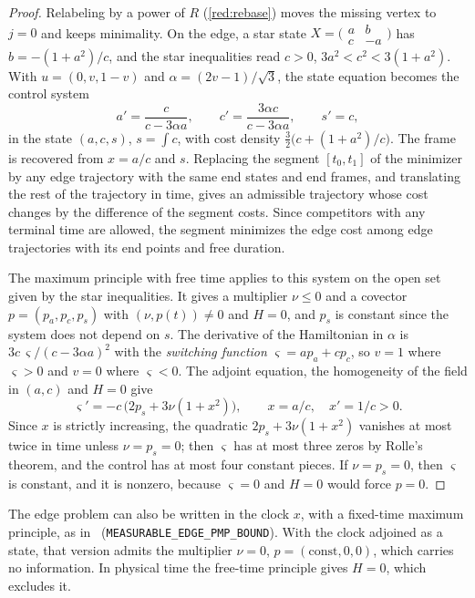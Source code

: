 \begin{proof}
Relabeling by a power of $R$ (\cref{red:rebase}) moves the missing vertex to $j=0$ and keeps
minimality. On the edge, a star state $X=\bigl(\begin{smallmatrix}a&b\\c&-a\end{smallmatrix}\bigr)$
has $b=-(1+a^2)/c$, and the star inequalities read $c>0$, $3a^2<c^2<3(1+a^2)$. With
$u=(0,v,1-v)$ and $\alpha=(2v-1)/\sqrt3$, the state equation becomes the control system
\[
a'=\frac{c}{c-3\alpha a},\qquad c'=\frac{3\alpha c}{c-3\alpha a},\qquad s'=c,
\]
in the state $(a,c,s)$, $s=\int c$, with cost density $\frac32\bigl(c+(1+a^2)/c\bigr)$. The frame is recovered from $x=a/c$ and $s$. Replacing the segment $[t_0,t_1]$ of the minimizer by any
edge trajectory with the same end states and end frames, and translating the rest of the
trajectory in time, gives an admissible trajectory whose cost changes by the difference of the
segment costs. Since competitors with any terminal time are
allowed, the segment minimizes the edge cost among edge trajectories with its end points and free
duration.

The maximum principle with free time applies to this system on the open set given by the star
inequalities. It gives a multiplier $\nu\le0$ and a covector $p=(p_a,p_c,p_s)$ with
$(\nu,p(t))\ne0$ and $H=0$, and $p_s$ is constant since the system does not depend on $s$. The
derivative of the Hamiltonian in $\alpha$ is $3c\,\varsigma/(c-3\alpha a)^2$ with the
\emph{switching function} $\varsigma=ap_a+cp_c$, so $v=1$ where $\varsigma>0$ and $v=0$ where
$\varsigma<0$. The adjoint equation, the homogeneity of the field in $(a,c)$ and $H=0$ give
\[
\varsigma'=-c\,\bigl(2p_s+3\nu(1+x^2)\bigr),\qquad x=a/c,\quad x'=1/c>0.
\]
Since $x$ is strictly increasing, the quadratic $2p_s+3\nu(1+x^2)$ vanishes at most twice in time
unless $\nu=p_s=0$; then $\varsigma$ has at most three zeros by Rolle's theorem, and the control
has at most four constant pieces. If $\nu=p_s=0$, then $\varsigma$ is constant, and it is nonzero,
because $\varsigma=0$ and $H=0$ would force $p=0$.
\end{proof}

The edge problem can also be written in the clock $x$, with a fixed-time maximum principle, as
in~\cite{Notes} (\texttt{MEASURABLE\_EDGE\_PMP\_BOUND}). With the clock adjoined as a state, that
version admits the multiplier $\nu=0$, $p=(\mathrm{const},0,0)$, which carries no information. In
physical time the free-time principle gives $H=0$, which excludes it.

